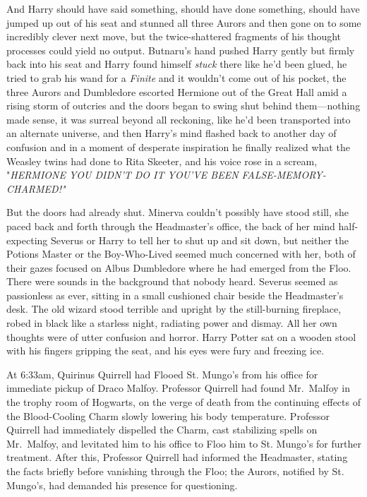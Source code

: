 And Harry should have said something, should have done something, should have 
jumped up out of his seat and stunned all three Aurors and then gone on to some 
incredibly clever next move, but the twice-shattered fragments of his thought 
processes could yield no output. Butnaru's hand pushed Harry gently but firmly 
back into his seat and Harry found himself \emph{stuck} there like he'd been 
glued, he tried to grab his wand for a \emph{Finite} and it wouldn't come out 
of his pocket, the three Aurors and Dumbledore escorted Hermione out of the 
Great Hall amid a rising storm of outcries and the doors began to swing shut 
behind them---nothing made sense, it was surreal beyond all reckoning, like 
he'd been transported into an alternate universe, and then Harry's mind flashed 
back to another day of confusion and in a moment of desperate inspiration he 
finally realized what the Weasley twins had done to Rita Skeeter, and his voice 
rose in a scream, "\emph{HERMIONE YOU DIDN'T DO IT YOU'VE BEEN 
FALSE-MEMORY-CHARMED!"}

But the doors had already shut.
\sbreak
Minerva couldn't possibly have stood still, she paced back and forth through 
the Headmaster's office, the back of her mind half-expecting Severus or Harry 
to tell her to shut up and sit down, but neither the Potions Master or the 
Boy-Who-Lived seemed much concerned with her, both of their gazes focused on 
Albus Dumbledore where he had emerged from the Floo. There were sounds in the 
background that nobody heard. Severus seemed as passionless as ever, sitting in 
a small cushioned chair beside the Headmaster's desk. The old wizard stood 
terrible and upright by the still-burning fireplace, robed in black like a 
starless night, radiating power and dismay. All her own thoughts were of utter 
confusion and horror. Harry Potter sat on a wooden stool with his fingers 
gripping the seat, and his eyes were fury and freezing ice.

At 6:33am, Quirinus Quirrell had Flooed St. Mungo's from his office for 
immediate pickup of Draco Malfoy. Professor Quirrell had found Mr.~Malfoy in 
the trophy room of Hogwarts, on the verge of death from the continuing effects 
of the Blood-Cooling Charm slowly lowering his body temperature. Professor 
Quirrell had immediately dispelled the Charm, cast stabilizing spells on 
Mr.~Malfoy, and levitated him to his office to Floo him to St. Mungo's for 
further treatment. After this, Professor Quirrell had informed the Headmaster, 
stating the facts briefly before vanishing through the Floo; the Aurors, 
notified by St. Mungo's, had demanded his presence for questioning.

